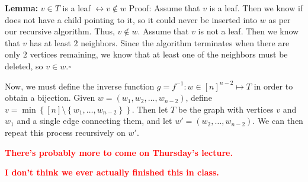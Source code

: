 \documentclass[10pt,letterpaper]{article}
\newcommand{\n}{\hfill\break}
\newcommand{\lemma}[1]{\par\noindent\settowidth{\hangindent}{\textbf{Lemma: }}\textbf{Lemma: }#1\n}
\newcommand{\proven}{\;$\square$\n}
\newcommand{\set}[1]{\left\{#1\right\}}
\newcommand{\inv}{^{-1}}
\newcommand{\flag}[1]{\textbf{\textcolor{red}{#1}}}
\begin{document}
\lemma{$v\in{}T$ is a leaf $\leftrightarrow{}v\not\in{}w$\n
Proof: Assume that $v$ is a leaf. Then we know if does not have a child pointing to it, so it could never be inserted into $w$ as per our recursive algorithm. Thus, $v\not\in{}w$.\n
Assume that $v$ is not a leaf. Then we know that $v$ has at least $2$ neighbors. Since the algorithm terminates when there are only $2$ vertices remaining, we know that at least one of the neighbors must be deleted, so $v\in{}w$.\proven}

\par\noindent Now, we must define the inverse function $g=f\inv:w\in{}[n]^{n-2}\mapsto{}T$ in order to obtain a bijection. Given $w=(w_{1},w_{2},\ldots,w_{n-2})$, define $v=\min\set{[n]\setminus\set{w_{1},\ldots,w_{n-2}}}$. Then let $T$ be the graph with vertices $v$ and $w_{1}$ and a single edge connecting them, and let $w'=(w_{2},\ldots,w_{n-2})$. We can then repeat this process recursively on $w'$.

\par\noindent\;

\par\noindent\flag{There's probably more to come on Thursday's lecture.}

\par\noindent\flag{I don't think we ever actually finished this in class.}
\end{document}
